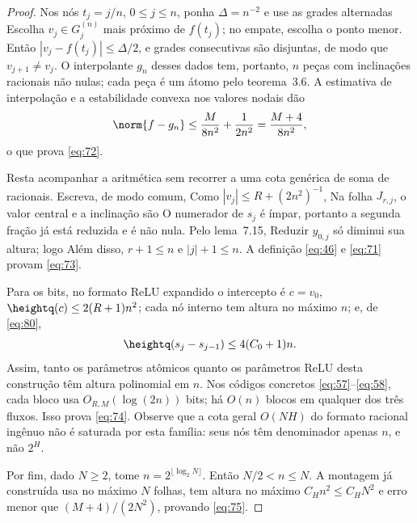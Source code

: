 \begin{proof}
Nos nós $t_j=j/n$, $0\le j\le n$, ponha $\Delta=n^{-2}$ e use as grades alternadas
Escolha $v_j\in G_j^{(n)}$ mais próximo de $f(t_j)$; no empate, escolha o ponto menor. Então $|v_j-f(t_j)|\le\Delta/2$, e grades consecutivas são disjuntas, de modo que $v_{j+1}\ne v_j$. O interpolante $g_n$ desses dados tem, portanto, $n$ peças com inclinações racionais não nulas; cada peça é um átomo pelo teorema~3.6. A estimativa de interpolação e a estabilidade convexa nos valores nodais dão
\[
\norm{f-g_n}\le\frac{M}{8n^2}+\frac1{2n^2}=\frac{M+4}{8n^2},
\]
o que prova \eqref{eq:72}.

Resta acompanhar a aritmética sem recorrer a uma cota genérica de soma de racionais. Escreva, de modo comum,
Como $|v_j|\le R+(2n^2)^{-1}$,
Na folha $J_{r,j}$, o valor central e a inclinação são
O numerador de $s_j$ é ímpar, portanto a segunda fração já está reduzida e é não nula. Pelo lema~7.15,
Reduzir $y_{0,j}$ só diminui sua altura; logo
Além disso, $r+1\le n$ e $|j|+1\le n$. A definição \eqref{eq:46} e \eqref{eq:71} provam \eqref{eq:73}.

Para os bits, no formato ReLU expandido o intercepto é $c=v_0$, $\heightq(c)\le2(R+1)n^2$; cada nó interno tem altura no máximo $n$; e, de \eqref{eq:80},
\[
\heightq(s_j-s_{j-1})\le4(C_0+1)n.
\]
Assim, tanto os parâmetros atômicos quanto os parâmetros ReLU desta construção têm altura polinomial em $n$. Nos códigos concretos \eqref{eq:57}--\eqref{eq:58}, cada bloco usa $O_{R,M}(\log(2n))$ bits; há $O(n)$ blocos em qualquer dos três fluxos. Isso prova \eqref{eq:74}. Observe que a cota geral $O(NH)$ do formato racional ingênuo não é saturada por esta família: seus nós têm denominador apenas $n$, e não $2^H$.

Por fim, dado $N\ge2$, tome $n=2^{\lfloor\log_2N\rfloor}$. Então $N/2<n\le N$. A montagem já construída usa no máximo $N$ folhas, tem altura no máximo $C_Hn^2\le C_HN^2$ e erro menor que $(M+4)/(2N^2)$, provando \eqref{eq:75}.
\end{proof}

